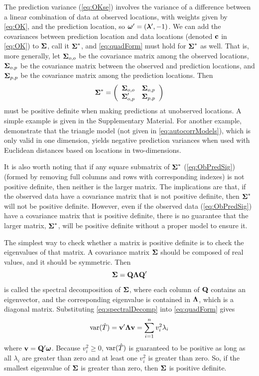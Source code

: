\documentclass[11pt, titlepage]{article}\usepackage[]{graphicx}\usepackage[]{color}
\begin{document}
\begin{spacing}{1.9}
\begin{flushleft}
The prediction variance (\ref{eq:OKse}) involves the variance of a difference between a linear combination of data at observed locations, with weights given by \ref{eq:OK}, and the prediction location, so $\mbox{\boldmath $\omega$}^{\prime} = ({\boldsymbol{\lambda}}^{\prime},-1)$. We can add the covariances between prediction location and data locations (denoted $\mathbf{c}$ in \ref{eq:OK}) to $\mbox{\boldmath $\Sigma$}$, call it $\mbox{\boldmath $\Sigma$}^*$, and \ref{eq:quadForm} must hold for $\mbox{\boldmath $\Sigma$}^*$ as well. That is, more generally, let $\mbox{\boldmath $\Sigma$}_{o,o}$ be the covariance matrix among the observed locations, $\mbox{\boldmath $\Sigma$}_{o,p}$ be the covariance matrix between the observed and prediction locations, and $\mbox{\boldmath $\Sigma$}_{p,p}$  be the covariance matrix among the prediction locations. Then
\begin{equation} \label{eq:ObPredSig}
				\mbox{\boldmath $\Sigma$}^* = \left(
					\begin{array}{cc}
									\mbox{\boldmath $\Sigma$}_{o,o} & \mbox{\boldmath $\Sigma$}_{o,p} \\
									\mbox{\boldmath $\Sigma$}_{o,p}^{\prime} & \mbox{\boldmath $\Sigma$}_{p,p}
					\end{array}
				\right)
\end{equation}
must be positive definite when making predictions at unobserved locations. A simple example is given in the Supplementary Material. For another example, \citet{Guil:Schi:Porc:Bevi:vali:2014} demonstrate that the triangle model (not given in \ref{eq:autocorrModels}), which is only valid in one dimension, yields negative prediction variances when used with Euclidean distances based on locations in two-dimensions.  

It is also worth noting that if any square submatrix of $\mbox{\boldmath $\Sigma$}^*$ (\ref{eq:ObPredSig}) (formed by removing full columns and rows with corresponding indexes) is not positive definite, then neither is the larger matrix.  The implications are that, if the observed data have a covariance matrix that is not positive definite, then $\mbox{\boldmath $\Sigma$}^*$ will not be positive definite.  However, even if the observed data (\ref{eq:ObPredSig}) have a covariance matrix that is positive definite, there is no guarantee that the larger matrix, $\mbox{\boldmath $\Sigma$}^*$, will be positive definite without a proper model to ensure it.

The simplest way to check whether a matrix is positive definite is to check the eigenvalues of that matrix.  A covariance matrix $\mbox{\boldmath $\Sigma$}$ should be composed of real values, and it should be symmetric.  Then 
\begin{equation} \label{eq:spectralDecomp}
  \mbox{\boldmath $\Sigma$} = \mathbf{Q}\mbox{\boldmath $\Lambda$}\mathbf{Q}^{\prime}
\end{equation}
is called the spectral decomposition of $\mbox{\boldmath $\Sigma$}$, where each column of $\mathbf{Q}$ contains an eigenvector, and the corresponding eigenvalue is contained in $\mbox{\boldmath $\Lambda$}$, which is a diagonal matrix.  Substituting \ref{eq:spectralDecomp} into \ref{eq:quadForm} gives
\[
\textrm{var}(\hat{T}) = \mathbf{v}^{\prime}\mbox{\boldmath $\Lambda$}\mathbf{v} = \sum_{i=1}^n v_i^2\lambda_i
\]
where $\mathbf{v} = \mathbf{Q}^{\prime}\mbox{\boldmath $\omega$}$. Because $v_i^2 \ge 0$, $\textrm{var}(\hat{T})$ is guaranteed to be positive as long as all $\lambda_i$ are greater than zero and at least one $v_i^2$ is greater than zero.  So, if the smallest eigenvalue of $\mbox{\boldmath $\Sigma$}$ is greater than zero, then $\mbox{\boldmath $\Sigma$}$ is positive definite.


\end{flushleft}
\end{spacing}
\end{document}
